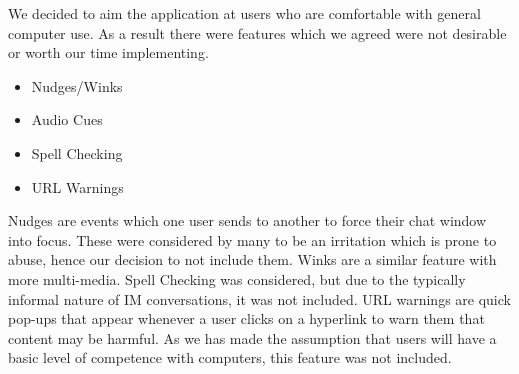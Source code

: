 We decided to aim the application at users who are comfortable with general computer use. As a result there were features which we agreed were not desirable or worth our time implementing.

\begin{itemize}

\item{Nudges/Winks}
\item{Audio Cues}
\item{Spell Checking}
\item{URL Warnings}

\end{itemize}

Nudges are events which one user sends to another to force their chat window into focus. These were considered by many to be an irritation which is prone to abuse, hence our decision to not include them. Winks are a similar feature with more multi-media. Spell Checking was considered, but due to the typically informal nature of IM conversations, it was not included. URL warnings are quick pop-ups that appear whenever a user clicks on a hyperlink to warn them that content may be harmful. As we has made the assumption that users will have a basic level of competence with computers, this feature was not included.
